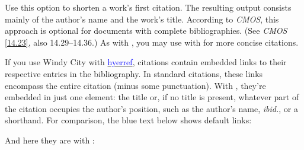 \documentclass[11pt,letterpaper,oneside]{article}
\begin{document}
\begin{optionlist}
\noindent Use this option to shorten a work's first citation. The
resulting output consists mainly of the author's name and the work's
title. According to \textit{CMOS}, this approach is optional for
documents with complete bibliographies. (See \textit{CMOS}
\ref{14.23}, also 14.29--14.36.) As with , you may use
 with  for more concise citations.


\noindent If you use Windy City with
\href{http://www.ctan.org/pkg/hyperref}{\textcolor{blue}{hyerref}},
citations contain embedded links to their respective entries in the
bibliography. In standard citations, these links encompass the entire
citation (minus some punctuation). With , they're
embedded in just one element: the title or, if no title is present,
whatever part of the citation occupies the author's position, such as
the author's name, \textit{ibid.}, or a shorthand. For comparison, the
blue text below shows default links:

\hypersetup{citecolor=blue}
\begin{citenobib}
\item \cite[24--25]{morley1995}
\item \cite{schwartz1992}
\item \cite{kaiser1964}
\item \cite[43]{morley1995}
\item \cite[138]{schwartz1992}
\item \cite[189--90]{kaiser1964}
\end{citenobib}

\noindent And here they are with :

\begin{citenobib}
\item \cite[24--25]{morley1995}
\item \cite{schwartz1992}
\item \cite{kaiser1964}
\item \cite[43]{morley1995}
\item \cite[138]{schwartz1992}
\item \cite[189--90]{kaiser1964}
\end{citenobib}
\hypersetup{citecolor=}


\end{optionlist}
\end{document}
